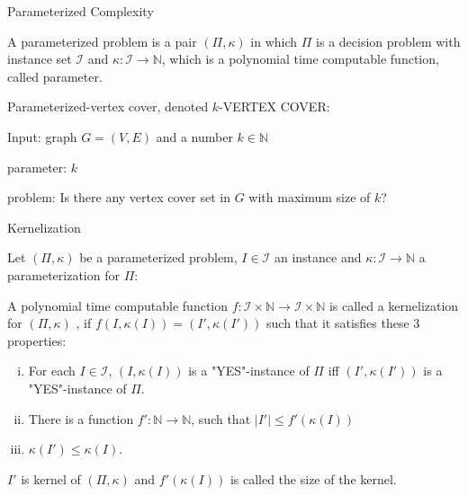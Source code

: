 \documentclass{beamer}
\begin{document}
\begin{frame}{Parameterized Complexity}
\begin{definition}
A \color{red} parameterized problem \color{black} is a pair $(\Pi, \kappa)$ in which $\Pi$ is a
decision problem with instance set $\mathcal{I}$ and $\kappa : \mathcal{I} \to \mathbb{N}$, which is a polynomial
time computable function, called parameter.
\end{definition}
 
\begin{example}
Parameterized-vertex cover, denoted $k$-VERTEX COVER:

Input: graph $G = (V, E)$ and a number $k \in \mathbb{N}$

parameter: $k$

problem: Is there any vertex cover set in $G$ with maximum size of $k$?
\end{example}

\end{frame}

\begin{frame}{Kernelization}

\begin{definition}
Let $(\Pi, \kappa)$ be a parameterized problem, $I\in\mathcal{I}$ an instance and $\kappa: \mathcal{I} \to \mathbb{N}$ a parameterization for $\Pi$:
 
A polynomial time computable function $f : \mathcal{I} \times \mathbb{N} \to \mathcal{I} \times \mathbb{N}$ is called a
\color{red} kernelization \color{black} for $(\Pi, \kappa)$ , if $f(I, \kappa(I)) = (I', \kappa(I'))$ such that it satisfies these 3 properties:
 
\begin{enumerate}[(i)]
\item For each $I \in \mathcal{I}$, $(I, \kappa(I))$ is a "YES"-instance of $\Pi$ iff $(I', \kappa(I'))$ is a "YES"-instance of $\Pi$.
 
\item There is a function $f': \mathbb{N} \to \mathbb{N}$, such that $|I'| \leq f'(\kappa(I))$
 
\item $\kappa(I')\leq \kappa(I)$.
\end{enumerate}
 
$I'$ is \color{red} kernel \color{black} of $(\Pi, \kappa)$ and $f'(\kappa(I))$ is called the size of the kernel.

\end{definition}

\end{frame}
\end{document}
